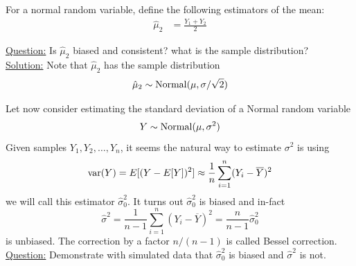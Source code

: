 \begin{itemize}
\begin{example}
For a normal random variable, define the following estimators of the mean:
\begin{align*}
\hat{\mu}_2 &= \frac{Y_1 + Y_2}{2}
\end{align*}

\noindent
\underline{Question:}  Is $\hat{\mu}_2$ biased and consistent? what is the sample distribution?\\


\noindent
\underline{Solution:}
Note that $\hat{\mu}_2$ has the sample distribution 
\begin{equation*}
\hat{\mu}_2  \sim {\rm Normal}(\mu,\sigma/\sqrt{2})
\end{equation*}
\end{example}


\begin{example}
Let now consider estimating the standard deviation of a Normal random variable
\begin{equation*}
Y \sim {\rm Normal}(\mu,\sigma^2)
\end{equation*}
Given samples $Y_1,Y_2,\dots,Y_n$, it seems the natural way to estimate $\sigma^2$ is using
\begin{equation*}
{\rm var}(Y) = E[(Y-E[Y])^2] \approx \frac{1}{n}\sum_{i=1}^n(Y_i-\overline{Y})^2
\end{equation*}
we will call this estimator $\hat{\sigma}_0^2$. It turns out $\hat{\sigma}_0^2$ is biased and in-fact 
\begin{equation*}
\hat{\sigma}^2 = \frac{1}{n-1}\sum_{i=1}^n(Y_i-\overline{Y})^2 = \frac{n}{n-1}\hat{\sigma}_0^2
\end{equation*}
is unbiased. The correction by a factor $n/(n-1)$ is called Bessel correction. \\

\noindent
\underline{Question:} Demonstrate with simulated data that $\hat{\sigma}_0^2$ is biased and $\hat{\sigma}^2$ is not. 


\end{example}




\end{itemize}




